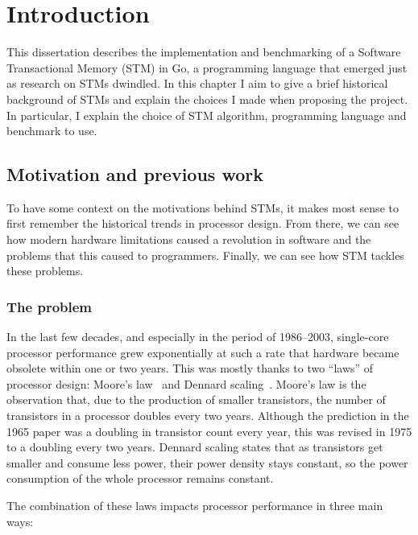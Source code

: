 \documentclass[12pt,a4paper,oneside,openright]{report}
\begin{document}
\chapter{Introduction}


This dissertation describes the implementation and benchmarking of a
Software Transactional Memory (STM) in Go, a programming language that
emerged just as research on STMs dwindled. In this chapter I aim to
give a brief historical background of STMs and explain the choices I
made when proposing the project. In particular, I explain the choice
of STM algorithm, programming language and benchmark to use.

\section{Motivation and previous work}
\label{sec:motivation}

To have some context on the motivations behind STMs, it makes most
sense to first remember the historical trends in processor
design. From there, we can see how modern hardware limitations caused
a revolution in software and the problems that this caused to
programmers. Finally, we can see how STM tackles these problems.

\subsection{The problem}
\label{sec:problem}

In the last few decades, and especially in the period of 1986--2003,
single-core processor performance grew exponentially at such a rate
that hardware became obsolete within one or two years. This was mostly
thanks to two ``laws'' of processor design: Moore's
law~\cite{MooreLaw} and Dennard scaling~\cite{DennardScaling}. Moore's
law is the observation that, due to the production of smaller
transistors, the number of transistors in a processor doubles every
two years. Although the prediction in the 1965 paper was a doubling in
transistor count every year, this was revised in 1975 to a doubling
every two years. Dennard scaling states that as transistors get
smaller and consume less power, their power density stays constant, so
the power consumption of the whole processor remains constant.

The combination of these laws impacts processor performance in three
main ways:
\end{document}
